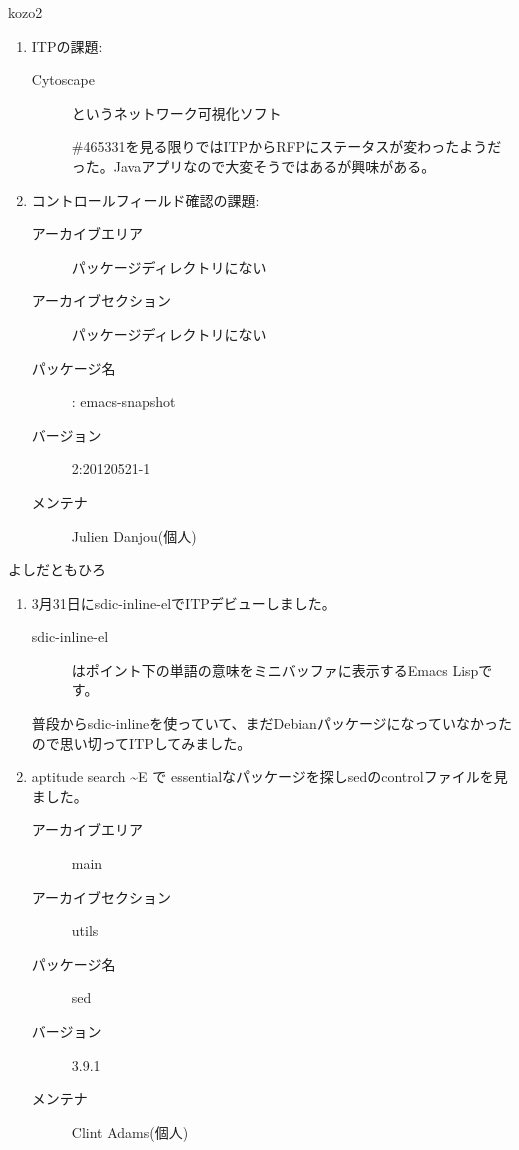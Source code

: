 \documentclass[mingoth,a4paper]{jsarticle}
\begin{document}
\begin{prework}{ kozo2 }
  \begin{enumerate}
  \item ITPの課題:
    \begin{description}
    \item [Cytoscape] というネットワーク可視化ソフト

      \#465331を見る限りではITPからRFPにステータスが変わったようだった。Javaアプリなので大変そうではあるが興味がある。
    \end{description}
  \item コントロールフィールド確認の課題:
    \begin{description}
    \item [アーカイブエリア] パッケージディレクトリにない
    \item [アーカイブセクション] パッケージディレクトリにない
    \item [パッケージ名]: emacs-snapshot
    \item [バージョン] 2:20120521-1
    \item [メンテナ] Julien Danjou(個人)
    \end{description}
  \end{enumerate}
\end{prework}

\begin{prework}{ よしだともひろ }
  \begin{enumerate}
  \item 3月31日にsdic-inline-elでITPデビューしました。
    \begin{description}
    \item [sdic-inline-el] はポイント下の単語の意味をミニバッファに表示するEmacs Lispです。
    \end{description}
    普段からsdic-inlineを使っていて、まだDebianパッケージになっていなかったので思い切ってITPしてみました。
  \item aptitude search \textasciitilde{}E で essentialなパッケージを探しsedのcontrolファイルを見ました。
    \begin{description}
    \item [アーカイブエリア] main
    \item [アーカイブセクション] utils
    \item [パッケージ名] sed
    \item [バージョン] 3.9.1
    \item [メンテナ] Clint Adams(個人)
    \end{description}
  \end{enumerate}
\end{prework}
\end{document}

